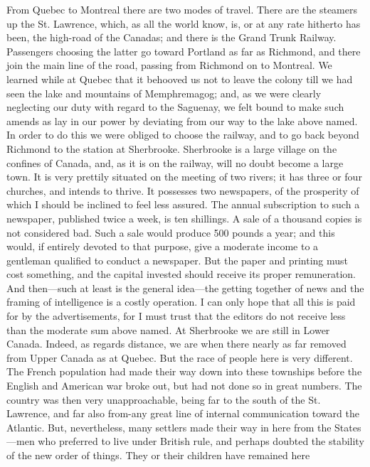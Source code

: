 From Quebec to Montreal there are two modes of travel.  There are
the steamers up the St. Lawrence, which, as all the world know, is,
or at any rate hitherto has been, the high-road of the Canadas; and
there is the Grand Trunk Railway.  Passengers choosing the latter
go toward Portland as far as Richmond, and there join the main line
of the road, passing from Richmond on to Montreal.  We learned
while at Quebec that it behooved us not to leave the colony till we
had seen the lake and mountains of Memphremagog; and, as we were
clearly neglecting our duty with regard to the Saguenay, we felt
bound to make such amends as lay in our power by deviating from our
way to the lake above named.  In order to do this we were obliged
to choose the railway, and to go back beyond Richmond to the
station at Sherbrooke.  Sherbrooke is a large village on the
confines of Canada, and, as it is on the railway, will no doubt
become a large town.  It is very prettily situated on the meeting
of two rivers; it has three or four churches, and intends to
thrive.  It possesses two newspapers, of the prosperity of which I
should be inclined to feel less assured.  The annual subscription
to such a newspaper, published twice a week, is ten shillings.  A
sale of a thousand copies is not considered bad.  Such a sale would
produce 500 pounds a year; and this would, if entirely devoted to
that purpose, give a moderate income to a gentleman qualified to
conduct a newspaper.  But the paper and printing must cost
something, and the capital invested should receive its proper
remuneration.  And then---such at least is the general idea---the
getting together of news and the framing of intelligence is a
costly operation.  I can only hope that all this is paid for by the
advertisements, for I must trust that the editors do not receive
less than the moderate sum above named.  At Sherbrooke we are still
in Lower Canada.  Indeed, as regards distance, we are when there
nearly as far removed from Upper Canada as at Quebec.  But the race
of people here is very different.  The French population had made
their way down into these townships before the English and American
war broke out, but had not done so in great numbers.  The country
was then very unapproachable, being far to the south of the St.
Lawrence, and far also from-any great line of internal
communication toward the Atlantic.  But, nevertheless, many
settlers made their way in here from the States---men who preferred
to live under British rule, and perhaps doubted the stability of
the new order of things.  They or their children have remained here
